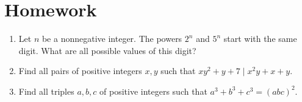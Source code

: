 \documentclass{article}
\begin{document}
\section{Homework}
  \begin{enumerate}
    \item Let $n$ be a nonnegative integer.
      The powers $2^n$ and $5^n$ start with the same digit. What are all
      possible values of this digit?
    \item Find all pairs of positive integers $x,y$ such that $xy^2+y+7\mid
      x^2y+x+y$.
    \item Find all triples $a,b,c$ of positive integers such that
      $a^3+b^3+c^3=(abc)^2$.
  \end{enumerate}
\end{document}
